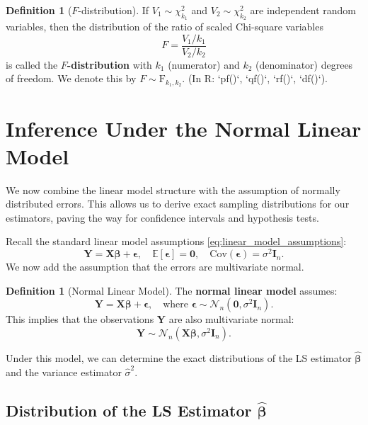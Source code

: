 \documentclass[11pt, letterpaper]{article}
\theoremstyle{plain} %
\theoremstyle{definition} %
\newtheorem{definition}[theorem]{Definition}
\theoremstyle{remark} %
\renewcommand{\mathbf}{\boldsymbol} %
\newcommand{\E}{\mathbb{E}}
\newcommand{\Cov}{\mathrm{Cov}} %
\newcommand{\Normal}{\mathcal{N}}
\newcommand{\Chisq}{\chi^2}
\newcommand{\Fdist}{\mathrm{F}}
\newcommand{\I}{\mathbf{I}} %
\begin{document}
\begin{definition}[$F$-distribution] \label{def:f_dist}
If $V_1 \sim \Chisq_{k_1}$ and $V_2 \sim \Chisq_{k_2}$ are independent random variables, then the distribution of the ratio of scaled Chi-square variables
\[
F = \frac{V_1 / k_1}{V_2 / k_2}
\]
is called the \textbf{$F$-distribution} with $k_1$ (numerator) and $k_2$ (denominator) degrees of freedom. We denote this by $F \sim \Fdist_{k_1, k_2}$.
(In R: `pf()`, `qf()`, `rf()`, `df()`).
\end{definition}

\section{Inference Under the Normal Linear Model}

We now combine the linear model structure with the assumption of normally distributed errors. This allows us to derive exact sampling distributions for our estimators, paving the way for confidence intervals and hypothesis tests.

Recall the standard linear model assumptions \eqref{eq:linear_model_assumptions}:
\[
\boldsymbol{Y} = \boldsymbol{X}\boldsymbol{\beta} + \boldsymbol{\epsilon}, \quad \E[\boldsymbol{\epsilon}] = \mathbf{0}, \quad \Cov(\boldsymbol{\epsilon}) = \sigma^2 \I_n.
\]
We now add the assumption that the errors are multivariate normal.

\begin{definition}[Normal Linear Model]
The \textbf{normal linear model} assumes:
\begin{equation} \label{eq:normal_linear_model}
\boldsymbol{Y} = \boldsymbol{X}\boldsymbol{\beta} + \boldsymbol{\epsilon}, \quad \text{where } \boldsymbol{\epsilon} \sim \Normal_n(\mathbf{0}, \sigma^2 \I_n).
\end{equation}
This implies that the observations $\boldsymbol{Y}$ are also multivariate normal:
\[ \boldsymbol{Y} \sim \Normal_n(\boldsymbol{X}\boldsymbol{\beta}, \sigma^2 \I_n). \]
\end{definition}

Under this model, we can determine the exact distributions of the LS estimator $\hat{\boldsymbol{\beta}}$ and the variance estimator $\hat{\sigma}^2$.

\subsection{Distribution of the LS Estimator $\hat{\boldsymbol{\beta}}$}
\end{document}
